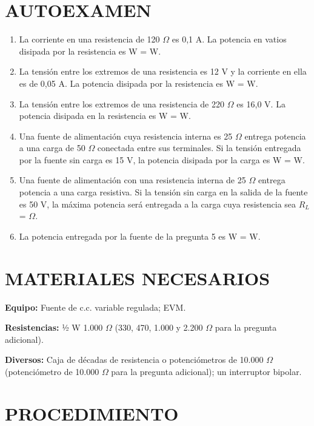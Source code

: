 \documentclass[12pt]{article}
\begin{document}
\section*{AUTOEXAMEN}
\begin{enumerate}
    \item La corriente en una resistencia de 120 $\Omega$ es 0,1 A. La potencia en vatios disipada por la resistencia es W = \dotfill W.
    \item La tensión entre los extremos de una resistencia es 12 V y la corriente en ella es de 0,05 A. La potencia disipada por la resistencia es W = \dotfill W.
    \item La tensión entre los extremos de una resistencia de 220 $\Omega$ es 16,0 V. La potencia disipada en la resistencia es W = \dotfill W.
    \item Una fuente de alimentación cuya resistencia interna es 25 $\Omega$ entrega potencia a una carga de 50 $\Omega$ conectada entre sus terminales. Si la tensión entregada por la fuente sin carga es 15 V, la potencia disipada por la carga es W = \dotfill W.
    \item Una fuente de alimentación con una resistencia interna de 25 $\Omega$ entrega potencia a una carga resistiva. Si la tensión sin carga en la salida de la fuente es 50 V, la máxima potencia será entregada a la carga cuya resistencia sea $R_L$ = \dotfill $\Omega$.
    \item La potencia entregada por la fuente de la pregunta 5 es W = \dotfill W.
\end{enumerate}

\section*{MATERIALES NECESARIOS}
\textbf{Equipo:} Fuente de c.c. variable regulada; EVM.

\textbf{Resistencias:} ½ W 1.000 $\Omega$ (330, 470, 1.000 y 2.200 $\Omega$ para la pregunta adicional).

\textbf{Diversos:} Caja de décadas de resistencia o potenciómetros de 10.000 $\Omega$ (potenciómetro de 10.000 $\Omega$ para la pregunta adicional); un interruptor bipolar.

\section*{PROCEDIMIENTO}
\end{document}
